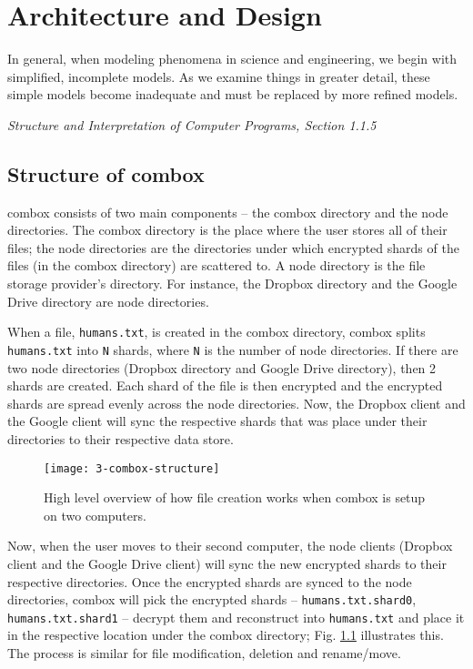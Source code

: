 \chapter{Architecture and Design}

\epigraph{In general, when modeling phenomena in science and
  engineering, we begin with simplified, incomplete models. As we
  examine things in greater detail, these simple models become
  inadequate and must be replaced by more refined
  models.}{\textit{Structure and Interpretation of Computer Programs,
    Section 1.1.5} \cite{sicp}}

\section{Structure of combox}

combox consists of two main components -- the combox directory and the
node directories. The combox directory is the place where the user
stores all of their files; the node directories are the directories
under which encrypted shards of the files (in the combox directory)
are scattered to. A node directory is the file storage provider's
directory. For instance, the Dropbox directory and the Google Drive
directory are node directories.

When a file, \verb+humans.txt+, is created in the combox directory,
combox splits \verb+humans.txt+ into \verb+N+ shards, where \verb+N+
is the number of node directories. If there are two node directories
(Dropbox directory and Google Drive directory), then 2 shards are
created. Each shard of the file is then encrypted and the encrypted
shards are spread evenly across the node directories. Now, the Dropbox
client and the Google client will sync the respective shards that was
place under their directories to their respective data store.

\begin{figure}[h]
  \texttt{[image: 3-combox-structure]}
  \caption{High level overview of how file creation works when combox
    is setup on two computers.}
  \label{fig:3-combox-structure}
\end{figure}

Now, when the user moves to their second computer, the node clients
(Dropbox client and the Google Drive client) will sync the new
encrypted shards to their respective directories. Once the encrypted
shards are synced to the node directories, combox will pick the
encrypted shards -- \verb+humans.txt.shard0+, \verb+humans.txt.shard1+
-- decrypt them and reconstruct into \verb+humans.txt+ and place it in
the respective location under the combox directory;
Fig. \ref{fig:3-combox-structure} illustrates this. The process is
similar for file modification, deletion and rename/move.

